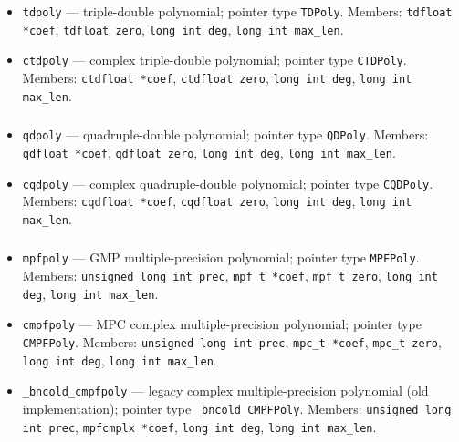 \begin{itemize}
    \item \texttt{tdpoly} --- triple-double polynomial; pointer type \texttt{TDPoly}.
        Members: \texttt{tdfloat *coef}, \texttt{tdfloat zero}, \texttt{long int deg}, \texttt{long int max\_len}.
    \item \texttt{ctdpoly} --- complex triple-double polynomial; pointer type \texttt{CTDPoly}.
        Members: \texttt{ctdfloat *coef}, \texttt{ctdfloat zero}, \texttt{long int deg}, \texttt{long int max\_len}.
\end{itemize}

\subsubsection{}

\begin{itemize}
    \item \texttt{qdpoly} --- quadruple-double polynomial; pointer type \texttt{QDPoly}.
        Members: \texttt{qdfloat *coef}, \texttt{qdfloat zero}, \texttt{long int deg}, \texttt{long int max\_len}.
    \item \texttt{cqdpoly} --- complex quadruple-double polynomial; pointer type \texttt{CQDPoly}.
        Members: \texttt{cqdfloat *coef}, \texttt{cqdfloat zero}, \texttt{long int deg}, \texttt{long int max\_len}.
\end{itemize}

\subsubsection{}

\begin{itemize}
    \item \texttt{mpfpoly} --- GMP multiple-precision polynomial; pointer type \texttt{MPFPoly}.
        Members: \texttt{unsigned long int prec}, \texttt{mpf\_t *coef}, \texttt{mpf\_t zero},
        \texttt{long int deg}, \texttt{long int max\_len}.
    \item \texttt{cmpfpoly} --- MPC complex multiple-precision polynomial; pointer type \texttt{CMPFPoly}.
        Members: \texttt{unsigned long int prec}, \texttt{mpc\_t *coef}, \texttt{mpc\_t zero},
        \texttt{long int deg}, \texttt{long int max\_len}.
    \item \texttt{\_bncold\_cmpfpoly} --- legacy complex multiple-precision polynomial (old implementation);
        pointer type \texttt{\_bncold\_CMPFPoly}.
        Members: \texttt{unsigned long int prec}, \texttt{mpfcmplx *coef},
        \texttt{long int deg}, \texttt{long int max\_len}.
\end{itemize}

